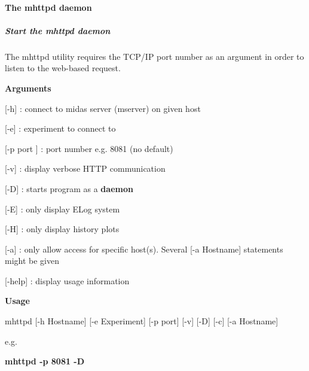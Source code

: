\par
 \label{index_end}
\hypertarget{index_end}{}
 \paragraph{The mhttpd daemon}\label{RC_mhttpd_utility}
\label{RC_mhttpd_utility_idx_mhttpd-utility}
\hypertarget{RC_mhttpd_utility_idx_mhttpd-utility}{}


\par
 \hypertarget{RC_mhttpd_utility_RC_mhttpd_Usage}{}\subparagraph{Start the mhttpd daemon}\label{RC_mhttpd_utility_RC_mhttpd_Usage}
The mhttpd utility requires the TCP/IP port number as an argument in order to listen to the web-\/based request.


\begin{DoxyItemize}
\item {\bfseries  Arguments }
\end{DoxyItemize}


\begin{DoxyItemize}
\item \mbox{[}-\/h\mbox{]} : connect to midas server (mserver) on given host
\item \mbox{[}-\/e\mbox{]} : experiment to connect to
\item \mbox{[}-\/p port \mbox{]} : port number e.g. 8081 (no default)
\item \mbox{[}-\/v\mbox{]} : display verbose HTTP communication
\item \mbox{[}-\/D\mbox{]} : starts program as a {\bfseries daemon} 
\item \mbox{[}-\/E\mbox{]} : only display ELog system
\item \mbox{[}-\/H\mbox{]} : only display history plots
\item \mbox{[}-\/a\mbox{]} : only allow access for specific host(s). Several \mbox{[}-\/a Hostname\mbox{]} statements might be given
\item \mbox{[}-\/help\mbox{]} : display usage information
\end{DoxyItemize}


\begin{DoxyItemize}
\item {\bfseries  Usage } \par
 mhttpd \mbox{[}-\/h Hostname\mbox{]} \mbox{[}-\/e Experiment\mbox{]} \mbox{[}-\/p port\mbox{]} \mbox{[}-\/v\mbox{]} \mbox{[}-\/D\mbox{]} \mbox{[}-\/c\mbox{]} \mbox{[}-\/a Hostname\mbox{]} \par
e.g. \par
 {\bfseries mhttpd -\/p 8081 -\/D }
\end{DoxyItemize}

